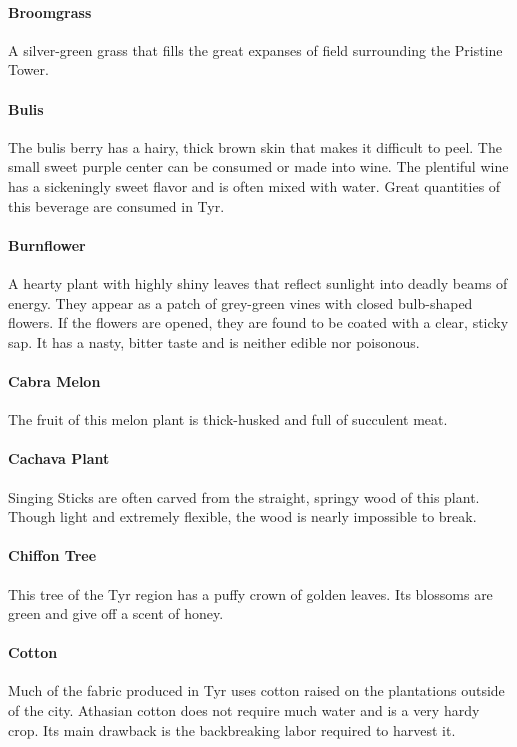 \begin{multicols}{2}
\paragraph{Broomgrass}
A silver-green grass that fills the great expanses of field surrounding the
Pristine Tower.

\paragraph{Bulis}
The bulis berry has a hairy, thick brown skin that makes it difficult to
peel. The small sweet purple center can be consumed or made into wine. The
plentiful wine has a sickeningly sweet flavor and is often mixed with water.
Great quantities of this beverage are consumed in Tyr.

\paragraph{Burnflower}
A hearty plant with highly shiny leaves that reflect sunlight into deadly beams
of energy. They appear as a patch of grey-green vines with closed bulb-shaped
flowers. If the flowers are opened, they are found to be coated with a clear,
sticky sap. It has a nasty, bitter taste and is neither edible nor poisonous.

\paragraph{Cabra Melon}
The fruit of this melon plant is thick-husked and full of succulent meat.

\paragraph{Cachava Plant}
Singing Sticks are often carved from the straight, springy wood of this plant.
Though light and extremely flexible, the wood is nearly impossible to break.

\paragraph{Chiffon Tree}
This tree of the Tyr region has a puffy crown of golden leaves. Its blossoms
are green and give off a scent of honey.

\paragraph{Cotton}
Much of the fabric produced in Tyr uses cotton raised on the plantations outside
of the city. Athasian cotton does not require much water and is a very hardy
crop. Its main drawback is the backbreaking labor required to harvest it.


\end{multicols}
